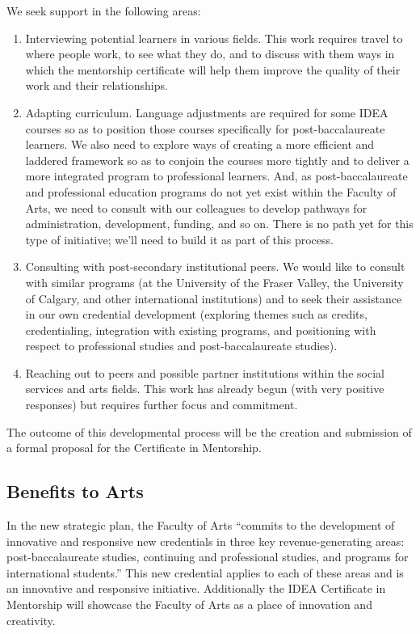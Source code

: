 \documentclass[]{article}
\begin{document}
We seek support in the following areas:

\begin{enumerate}
\def\labelenumi{\arabic{enumi}.}
\item
  Interviewing potential learners in various fields. This work requires
  travel to where people work, to see what they do, and to discuss with
  them ways in which the mentorship certificate will help them improve
  the quality of their work and their relationships.
\item
  Adapting curriculum. Language adjustments are required for some IDEA
  courses so as to position those courses specifically for
  post-baccalaureate learners. We also need to explore ways of creating
  a more efficient and laddered framework so as to conjoin the courses
  more tightly and to deliver a more integrated program to professional
  learners. And, as post-baccalaureate and professional education
  programs do not yet exist within the Faculty of Arts, we need to
  consult with our colleagues to develop pathways for administration,
  development, funding, and so on. There is no path yet for this type of
  initiative; we'll need to build it as part of this process.
\item
  Consulting with post-secondary institutional peers. We would like to consult with similar programs (at the University of the Fraser Valley, the University of Calgary, and other international institutions) and to seek their assistance in our own credential development (exploring themes such as credits, credentialing, integration with existing programs, and positioning with respect to professional studies and post-baccalaureate studies).
\item
  Reaching out to peers and possible partner institutions within the social services and arts fields. This work has already begun (with very positive
  responses) but requires further focus and commitment.
\end{enumerate}

The outcome of this developmental process will be the creation and submission of a formal proposal for the Certificate in Mentorship.


\subsection{Benefits to Arts}

In the new strategic plan, the Faculty of Arts ``commits to the development of
innovative and responsive new credentials in three key
revenue-generating areas: post-baccalaureate studies, continuing and
professional studies, and programs for international students.'' This
new credential applies to each of these areas and is an innovative and
responsive initiative. Additionally the IDEA Certificate in Mentorship
will showcase the Faculty of Arts as a place of innovation and creativity.
\end{document}
